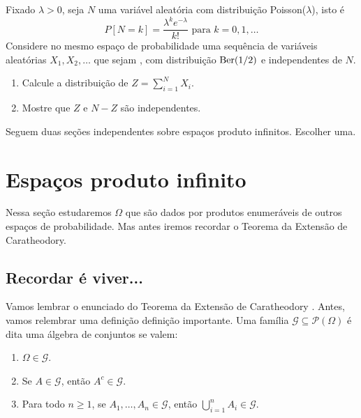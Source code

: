 \begin{topics}
\begin{exercise}
  Fixado $\lambda > 0$, seja $N$ uma variável aleatória com distribuição Poisson($\lambda$), isto é
  \begin{equation}
    P[N = k] = \frac{\lambda^k e^{-\lambda}}{k!} \text{ para $k = 0, 1, \dots$}
  \end{equation}
  Considere no mesmo espaço de probabilidade uma sequência de variáveis aleatórias $X_1, X_2, \dots$ que sejam \iid, com distribuição $\operatorname{Ber}(1/2)$ e independentes de $N$.
  \begin{enumerate}[\quad a)]
  \item Calcule a distribuição de $Z = \sum_{i=1}^N X_i$.
  \item Mostre que $Z$ e $N - Z$ são independentes.
  \end{enumerate}
\end{exercise}

\end{topics}

{\color{red}
  Seguem duas seções independentes sobre espaços produto infinitos.
  Escolher uma.
}

\section{Espaços produto infinito}
\label{s:Omega_produto}

Nessa seção estudaremos $\Omega$ que são dados por produtos enumeráveis de outros espaços de probabilidade.
Mas antes iremos recordar o Teorema da Extensão de Caratheodory.

\subsection{Recordar é viver...}

Vamos lembrar o enunciado do Teorema da Extensão de Caratheodory .
Antes, vamos relembrar uma definição definição importante.
Uma família $\mathcal{G} \subseteq \mathcal{P}(\Omega)$ é dita uma álgebra de conjuntos  se valem:
\begin{enumerate}[\quad a)]
  \item $\Omega \in \mathcal{G}$.
  \item Se $A \in \mathcal{G}$, então $A^c \in \mathcal{G}$.
  \item Para todo $n \geq 1$, se $A_1, \dots, A_n \in \mathcal{G}$, então $\bigcup_{i=1}^n A_i \in \mathcal{G}$.
\end{enumerate}

